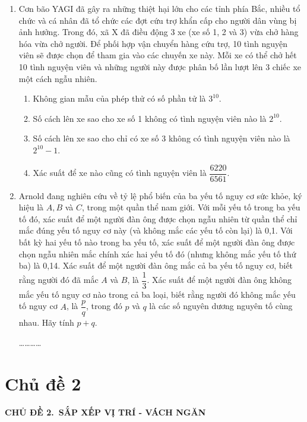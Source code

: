 \documentclass[12pt, a4paper]{article}
\begin{document}
\begin{enumerate}[label=\bfseries\color{mymagenta}\arabic*., leftmargin=*]
		\vspace{0.3cm}
		
		\item Cơn bão YAGI đã gây ra những thiệt hại lớn cho các tỉnh phía Bắc, nhiều tổ chức và cá nhân đã tổ chức các đợt cứu trợ khẩn cấp cho người dân vùng bị ảnh hưởng. Trong đó, xã X đã điều động 3 xe (xe số 1, 2 và 3) vừa chở hàng hóa vừa chở người. Để phối hợp vận chuyển hàng cứu trợ, 10 tình nguyện viên sẽ được chọn để tham gia vào các chuyến xe này. Mỗi xe có thể chở hết 10 tình nguyện viên và những người này được phân bố lần lượt lên 3 chiếc xe một cách ngẫu nhiên.
		\begin{enumerate}[label=\alph*)]
			\item Không gian mẫu của phép thử có số phần tử là $3^{10}$.
			\item Số cách lên xe sao cho xe số 1 không có tình nguyện viên nào là $2^{10}$.
			\item Số cách lên xe sao cho chỉ có xe số 3 không có tình nguyện viên nào là $2^{10} - 1$.
			\item Xác suất để xe nào cũng có tình nguyện viên là $\dfrac{6220}{6561}$.
		\end{enumerate}
		
		\vspace{0.3cm}
		
		\item Arnold đang nghiên cứu về tỷ lệ phổ biến của ba yếu tố nguy cơ sức khỏe, ký hiệu là $A, B$ và $C$, trong một quần thể nam giới. Với mỗi yếu tố trong ba yếu tố đó, xác suất để một người đàn ông được chọn ngẫu nhiên từ quần thể chỉ mắc đúng yếu tố nguy cơ này (và không mắc các yếu tố còn lại) là 0,1. Với bất kỳ hai yếu tố nào trong ba yếu tố, xác suất để một người đàn ông được chọn ngẫu nhiên mắc chính xác hai yếu tố đó (nhưng không mắc yếu tố thứ ba) là 0,14. Xác suất để một người đàn ông mắc cả ba yếu tố nguy cơ, biết rằng người đó đã mắc $A$ và $B$, là $\dfrac{1}{3}$. Xác suất để một người đàn ông không mắc yếu tố nguy cơ nào trong cả ba loại, biết rằng người đó không mắc yếu tố nguy cơ $A$, là $\dfrac{p}{q}$, trong đó $p$ và $q$ là các số nguyên dương nguyên tố cùng nhau. Hãy tính $p + q$.
		
		 \dots\dots\dots\dots
	\end{enumerate}
	
	\clearpage
	 \section*{Chủ đề 2}
\begin{tcolorbox}[colback=headerbg, colframe=headerborder, arc=3mm, boxrule=1.5pt, halign=center]
	\textbf{\Large CHỦ ĐỀ 2.\ SẮP XẾP VỊ TRÍ - VÁCH NGĂN}
\end{tcolorbox}
	\vspace{0.5cm}
	
\end{document}
